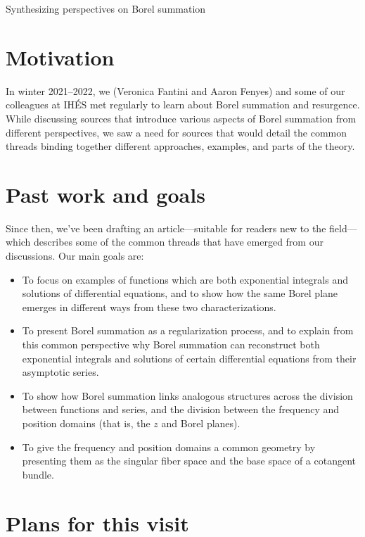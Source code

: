 \documentclass{article}[a4paper]
\begin{document}
\begin{center}
\Large Synthesizing perspectives on Borel summation
\end{center}

\section*{Motivation}
In winter 2021--2022, we (Veronica Fantini and Aaron Fenyes) and some of our colleagues at IH\'{E}S met regularly to learn about Borel summation and resurgence. While discussing sources that introduce various aspects of Borel summation from different perspectives, we saw a need for sources that would detail the common threads binding together different approaches, examples, and parts of the theory.
\section*{Past work and goals}
Since then, we've been drafting an article---suitable for readers new to the field---which describes some of the common threads that have emerged from our discussions. Our main goals are:

\begin{itemize}
\item To focus on examples of functions which are both exponential integrals and solutions of differential equations, and to show how the same Borel plane emerges in different ways from these two characterizations.
\item To present Borel summation as a regularization process, and to explain from this common perspective why Borel summation can reconstruct both exponential integrals and solutions of certain differential equations from their asymptotic series.
\item To show how Borel summation links analogous structures across the division between functions and series, and the division between the frequency and position domains (that is, the $z$ and Borel planes).
\item To give the frequency and position domains a common geometry by presenting them as the singular fiber space and the base space of a cotangent bundle.
\end{itemize}

\section*{Plans for this visit}
\end{document}
